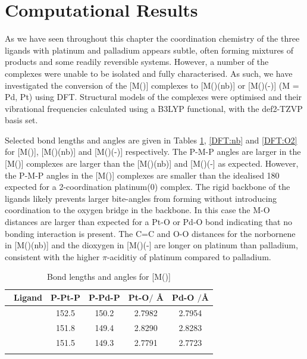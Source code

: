 
\section{Computational Results}

As we have seen throughout this chapter the coordination chemistry of the three \tBuxantphos{} ligands with platinum and palladium appears subtle, often forming mixtures of products and some readily reversible systems.  However, a number of the complexes were unable to be isolated and fully characterised.  As such, we have investigated the conversion of the [M(\tBuxantphos)] complexes to [M(\tBuxantphos)(nb)] or [M(\tBuxantphos)(-)] (M = Pd, Pt) using \gls{DFT}.  Structural models of the complexes were optimised and their vibrational frequencies calculated using a B3LYP functional,\cite{Becke1993, Lee1988, Vosko1980, Stephens1994} with the def2-TZVP basis set.\cite{Andrae1990, Weigend2005}  

Selected bond lengths and angles are given in Tables \ref{DFT:14}, \ref{DFT:nb} and \ref{DFT:O2} for [M(\tBuxantphos)], [M(\tBuxantphos)(nb)] and [M(\tBuxantphos)(-)] respectively.  The P-M-P angles are larger in the [M(\tBuxantphos)] complexes are larger than the [M(\tBuxantphos)(nb)] and [M(\tBuxantphos)(-] as expected.  However, the P-M-P angles in the [M(\tBuxantphos)] complexes are smaller than the idealised 180\degrees{} expected for a 2-coordination platinum(0) complex.  The rigid backbone of the \tBuxantphos{} ligands likely prevents larger bite-angles from forming without introducing coordination to the oxygen bridge in the backbone.  In this case the M-O distances are larger than expected for a Pt-O or Pd-O bond indicating that no bonding interaction is present.  The C=C and O-O distances for the norbornene in [M(\tBuxantphos)(nb)] and the dioxygen in [M(\tBuxantphos)(-] are longer on platinum than palladium, consistent with the higher $\pi$-aciditiy of platinum compared to palladium.\cite{Chianese2007}


\begin{table}[htbp]
\caption[Bond lengths and angles for [M(\tBuxantphos){]}]{Bond lengths and angles for [M(\tBuxantphos){]}}
\vspace{1em}
\label{DFT:14}
\small
\begin{center}
\begin{tabular}{l c c c c}
	\toprule
	~\bfseries{Ligand} & \bfseries{P-Pt-P\degrees{}} & \bfseries{P-Pd-P\degrees{}} & \bfseries{Pt-O$/$ \si{\angstrom}} & \bfseries{Pd-O $/$\si{\angstrom}}\\
	\midrule		
	~\tBuSixantphos	& 152.5 & 150.2 & 2.7982 & 2.7954\\
	~\tBuThixantphos	& 151.8 & 149.4 & 2.8290 & 2.8283\\
	~\tBuXantphos{}	& 151.5 & 149.3 & 2.7791 & 2.7723\\
	\bottomrule{}
\end{tabular}
\end{center}
\end{table}

